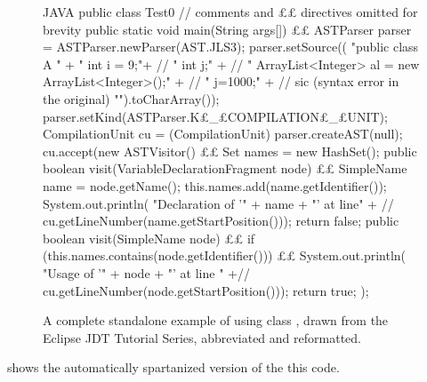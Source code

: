 \begin{figure}
  \caption{A complete standalone example of using class , drawn
    from the Eclipse JDT Tutorial Series, abbreviated and reformatted.} \label{figure:eclipse}
    \begin{adjustbox}{max width=\columnwidth}
      \begin{code}[minipage, width=1.13\columnwidth]{JAVA}
public class Test0 { // comments and ££ directives omitted for brevity
  public static void main(String args[]) {££
    ASTParser parser = ASTParser.newParser(AST.JLS3);
    parser.setSource((
      "public class A {\n" +
      " int i = 9;\n"+ //
      " int j;\n" + //
      " ArrayList<Integer> al = new ArrayList<Integer>();\n" + //
      " j=1000;\n" + // sic (syntax error in the original)
      "}\n").toCharArray());
    parser.setKind(ASTParser.K£\_£COMPILATION£\_£UNIT);
    CompilationUnit cu = (CompilationUnit) parser.createAST(null);
    cu.accept(new ASTVisitor() {££
      Set names = new HashSet();
      public boolean visit(VariableDeclarationFragment node) {££
        SimpleName name = node.getName();
        this.names.add(name.getIdentifier());
        System.out.println(
          "Declaration of '" + name + "' at line" + //
          cu.getLineNumber(name.getStartPosition()));
        return false;
      }
      public boolean visit(SimpleName node) {££
        if (this.names.contains(node.getIdentifier())) {££
          System.out.println(
            "Usage of '" + node + "' at line " +//
            cu.getLineNumber(node.getStartPosition()));
        }
        return true;
      }
    });
  }
}
\end{code}
  \end{adjustbox}
\end{figure}

 shows the automatically spartanized version of
the this code.

